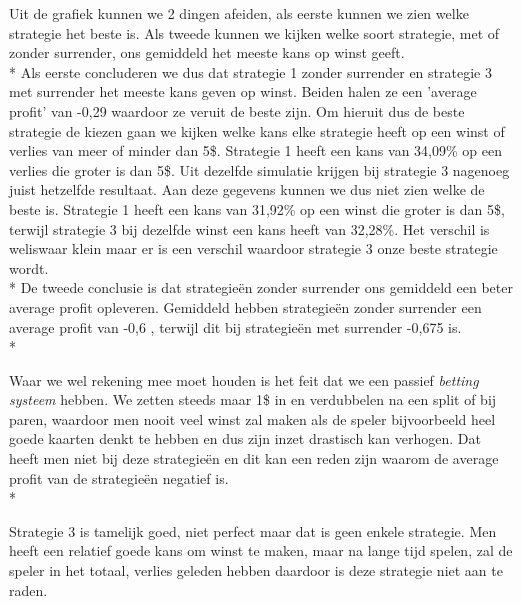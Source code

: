 \documentclass[conference]{IEEEtran}
\begin{document}
Uit de grafiek kunnen we 2 dingen afeiden, als eerste kunnen we zien welke strategie het beste is. Als tweede kunnen we kijken welke soort strategie, met of zonder surrender, ons gemiddeld het meeste kans op winst geeft. \\*
Als eerste concluderen we dus dat strategie 1 zonder surrender en strategie 3 met surrender het meeste kans geven op winst. Beiden halen ze een 'average profit' van -0,29 waardoor ze veruit de beste zijn. Om hieruit dus de beste strategie de kiezen gaan we kijken welke kans elke strategie heeft op een winst of verlies van meer of minder dan 5\$. Strategie 1 heeft een kans van 34,09\% op een verlies die groter is dan 5\$. Uit dezelfde simulatie krijgen bij strategie 3 nagenoeg juist hetzelfde resultaat. Aan deze gegevens kunnen we dus niet zien welke de beste is. Strategie 1 heeft een kans van 31,92\% op een winst die groter is dan 5\$, terwijl strategie 3 bij dezelfde winst een kans heeft van 32,28\%. Het verschil is weliswaar klein maar er is een verschil waardoor strategie 3 onze beste strategie wordt. \\*
De tweede conclusie is dat strategie\"en zonder surrender ons gemiddeld een beter average profit opleveren. Gemiddeld hebben strategie\"en zonder surrender een average profit van -0,6 , terwijl dit bij strategie\"en met surrender -0,675 is. \\*

Waar we wel rekening mee moet houden is het feit dat we een passief \textit{betting systeem} hebben. We zetten steeds maar 1\$ in en verdubbelen na een split of bij paren, waardoor men nooit veel winst zal maken als de speler bijvoorbeeld heel goede kaarten denkt te hebben en dus zijn inzet drastisch kan verhogen. Dat heeft men niet bij deze strategie\"en en dit kan een reden zijn waarom de average profit van de strategie\"en negatief is.\\*

Strategie 3 is tamelijk goed, niet perfect maar dat is geen enkele strategie. Men heeft een relatief goede kans om winst te maken, maar na lange tijd spelen, zal de speler in het totaal, verlies geleden hebben daardoor is deze strategie niet aan te raden. 


\newpage

\nocite{*}
\end{document}
